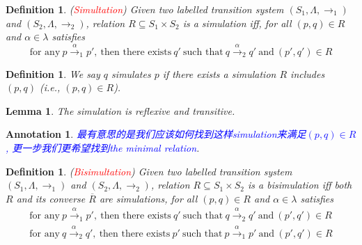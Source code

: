 \documentclass{article}
\newtheorem{lemma}[theorem]{Lemma}
\newtheorem{definition}[theorem]{Definition}
\newtheorem{annotation}[theorem]{Annotation}
\newcommand{\redt}[1]{\textcolor{red}{#1}}
\newcommand{\bluet}[1]{\textcolor{blue}{#1}}
\begin{document}
\begin{definition}
\rm (\redt{Simultation}) Given two labelled transition system $(S_1, \Lambda, \to_1)$ and $(S_2, \Lambda, \to_2)$, relation $R \subseteq S_1 \times S_2$ is a simulation iff, for all $(p,q) \in R$ and $\alpha \in \lambda$ satisfies
\[
	\text{for any}~p \xrightarrow{\alpha}_1 p', ~\text{then there exists}~ q'~\text{such that}~q \xrightarrow{\alpha}_2 q'~\text{and}~(p',q') \in R 	
\]
\begin{center}
\end{center}
\end{definition}

\begin{definition}
\rm We say $q$ simulates $p$ if there exists a simulation $R$ includes $(p,q)$ (i.e., $(p,q) \in R$).
\end{definition}

\begin{lemma}
\rm The simulation is reflexive and transitive. 
\end{lemma}

\begin{annotation}
\rm \bluet{最有意思的是我们应该如何找到这样simulation来满足$(p,q) \in R$, 更一步我们更希望找到the minimal relation}.
\end{annotation}

\begin{definition}
\rm (\redt{Bisimultation}) Given two labelled transition system $(S_1, \Lambda, \to_1)$ and $(S_2, \Lambda, \to_2)$, relation $R \subseteq S_1 \times S_2$ is a bisimulation iff both $R$ and its converse $\overline{R}$ are simulations, for all $(p,q) \in R$ and $\alpha \in \lambda$ satisfies
\[
	\begin{gathered}
	\text{for any}~p \xrightarrow{\alpha}_1 p', ~\text{then there exists}~ q'~\text{such that}~q \xrightarrow{\alpha}_2 q'~\text{and}~(p',q') \in R \\
	\text{for any}~q \xrightarrow{\alpha}_2 q', ~\text{then there exists}~ p'~\text{such that}~p \xrightarrow{\alpha}_1 p'~\text{and}~(p',q') \in R
	\end{gathered} 	
\]
\end{definition}
\end{document}
